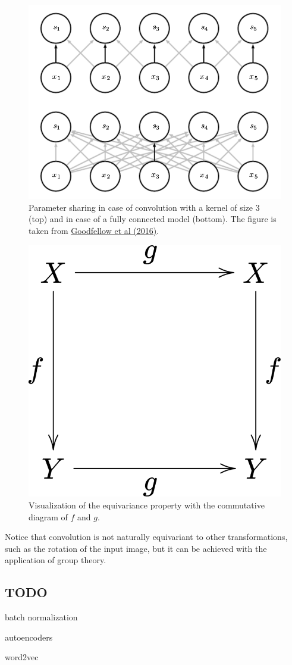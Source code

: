 \documentclass[12pt]{article}
\theoremstyle{plain}
\begin{document}
\begin{itemize}
\begin{figure}[h]
	\begin{center}
	\includegraphics[width=0.5\linewidth]{media/parameter_sharing_conv.png}
	\caption{Parameter sharing in case of convolution with a kernel of size $3$ (top) and in case of a fully connected model (bottom). The figure is taken from \protect\hyperlink{Deeplea_Goodfellow}{Goodfellow et al (2016)}. }
	\label{parameter_sharing_conv}
	\end{center}
\end{figure}

\begin{figure}[h!]
	\begin{center}
	\includegraphics[width=0.3\linewidth]{media/Equivariant_commutative_diagram.png}
	\caption{Visualization of the equivariance property with the commutative diagram of $f$ and $g$. }
	\label{commutative_diag_1}
	\end{center}
\end{figure}
\end{itemize}

Notice that convolution is not naturally equivariant to other transformations, such as the rotation of the input image, but it can be achieved with the application of group theory.

\subsection{TODO}
batch normalization

autoencoders

word2vec
\end{document}

